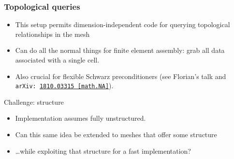 \documentclass[presentation,aspectratio=43, 10pt]{beamer}
\newcommand{\arxivlink}[2]{{\texttt{arXiv:\,\href{https://arxiv.org/abs/#1}{#1\,[#2]}}}}
\begin{document}
\begin{frame}
  \frametitle{Topological queries}
  \begin{itemize}
  \item This setup permits dimension-independent code for querying
    topological relationships in the mesh
  \item Can do all the normal things for finite element assembly: grab
    all data associated with a single cell.
  \item Also crucial for flexible Schwarz preconditioners (see
    Florian's talk and \textcite{Farrell:2018} \arxivlink{1810.03315}{math.NA}).
  \end{itemize}

  \begin{block}{Challenge: structure}
    \begin{itemize}
    \item Implementation assumes fully unstructured.
    \item Can this same idea be extended to meshes that offer some
      structure
    \item \dots while exploiting that structure for a fast implementation?
    \end{itemize}
  \end{block}
\end{frame}
\end{document}
